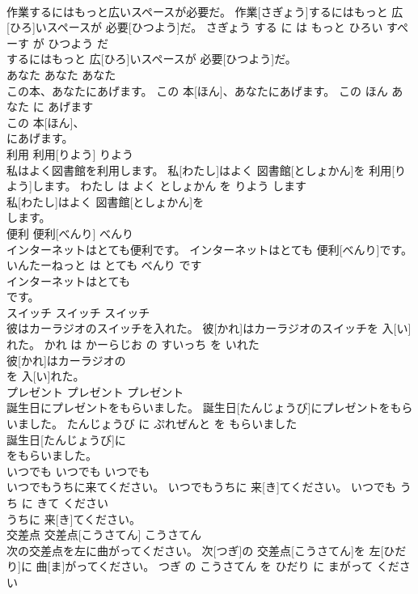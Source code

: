 \documentclass[8pt]{extreport}
\begin{document}
\begin{CJK}{UTF8}{min}
\\	作業するにはもっと広いスペースが必要だ。	作業[さぎょう]するにはもっと 広[ひろ]いスペースが 必要[ひつよう]だ。	さぎょう する に は もっと ひろい すぺーす が ひつよう だ	
\\	するにはもっと 広[ひろ]いスペースが 必要[ひつよう]だ。			
\\	あなた	あなた	あなた	
\\	この本、あなたにあげます。	この 本[ほん]、あなたにあげます。	この ほん あなた に あげます	
\\	この 本[ほん]、
\\	にあげます。			
\\	利用	利用[りよう]	りよう	
\\	私はよく図書館を利用します。	私[わたし]はよく 図書館[としょかん]を 利用[りよう]します。	わたし は よく としょかん を りよう します	
\\	私[わたし]はよく 図書館[としょかん]を
\\	します。			
\\	便利	便利[べんり]	べんり	
\\	インターネットはとても便利です。	インターネットはとても 便利[べんり]です。	いんたーねっと は とても べんり です	
\\	インターネットはとても
\\	です。			
\\	スイッチ	スイッチ	スイッチ	
\\	彼はカーラジオのスイッチを入れた。	彼[かれ]はカーラジオのスイッチを 入[い]れた。	かれ は かーらじお の すいっち を いれた	
\\	彼[かれ]はカーラジオの
\\	を 入[い]れた。			
\\	プレゼント	プレゼント	プレゼント	
\\	誕生日にプレゼントをもらいました。	誕生日[たんじょうび]にプレゼントをもらいました。	たんじょうび に ぷれぜんと を もらいました	
\\	誕生日[たんじょうび]に
\\	をもらいました。			
\\	いつでも	いつでも	いつでも	
\\	いつでもうちに来てください。	いつでもうちに 来[き]てください。	いつでも うち に きて ください	
\\	うちに 来[き]てください。			
\\	交差点	交差点[こうさてん]	こうさてん	
\\	次の交差点を左に曲がってください。	次[つぎ]の 交差点[こうさてん]を 左[ひだり]に 曲[ま]がってください。	つぎ の こうさてん を ひだり に まがって ください	

\end{CJK}
\end{document}
